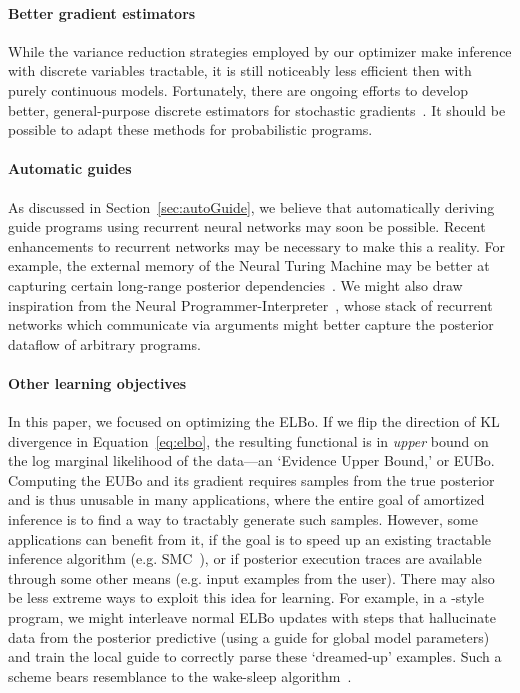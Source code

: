 \paragraph{Better gradient estimators}
While the variance reduction strategies employed by our optimizer make inference with discrete variables tractable, it is still noticeably less efficient then with purely continuous models.
Fortunately, there are ongoing efforts to develop better, general-purpose discrete estimators for stochastic gradients~\cite{MuProp,VIMCO}.
It should be possible to adapt these methods for probabilistic programs.

\paragraph{Automatic guides}
As discussed in Section~\ref{sec:autoGuide}, we believe that automatically deriving guide programs using recurrent neural networks may soon be possible.
Recent enhancements to recurrent networks may be necessary to make this a reality.
For example, the external memory of the Neural Turing Machine may be better at capturing certain long-range posterior dependencies~\cite{NTM}.
We might also draw inspiration from the Neural Programmer-Interpreter~\cite{NPI}, whose stack of recurrent networks which communicate via arguments might better capture the posterior dataflow of arbitrary programs.

\paragraph{Other learning objectives}
In this paper, we focused on optimizing the ELBo.
If we flip the direction of KL divergence in Equation~\ref{eq:elbo}, the resulting functional is in \emph{upper} bound on the log marginal likelihood of the data---an `Evidence Upper Bound,' or EUBo.
Computing the EUBo and its gradient requires samples from the true posterior and is thus unusable in many applications, where the entire goal of amortized inference is to find a way to tractably generate such samples.
However, some applications can benefit from it, if the goal is to speed up an existing tractable inference algorithm (e.g. SMC~\cite{NGPM}), or if posterior execution traces are available through some other means (e.g. input examples from the user).
There may also be less extreme ways to exploit this idea for learning.
For example, in a -style program, we might interleave normal ELBo updates with steps that hallucinate data from the posterior predictive (using a guide for global model parameters) and train the local guide to correctly parse these `dreamed-up' examples. Such a scheme bears resemblance to the wake-sleep algorithm~\cite{WakeSleep}.

